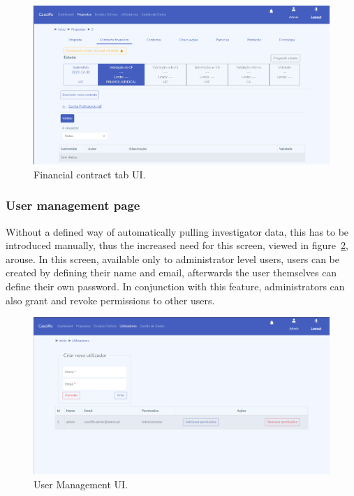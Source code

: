 \begin{figure}[H]
    \centering
    \includegraphics[scale=0.5]{Chapters/img/ui/proposal-cf-tab.png}
    \caption{Financial contract tab UI.}
    \label{fig:cf-tab-ui}
\end{figure}

\subsubsection{User management page}
Without a defined way of automatically pulling investigator data, this has to be introduced manually, thus the increased need for this screen, viewed in figure~\ref{fig:user-management-ui}, arouse. In this screen, available only to administrator level users, users can be created by defining their name and email, afterwards the user themselves can define their own password. In conjunction with this feature, administrators can also grant and revoke permissions to other users.


\begin{figure}[H]
    \centering
    \includegraphics[scale=0.5]{Chapters/img/ui/user-management.png}
    \caption{User Management UI.}
    \label{fig:user-management-ui}
\end{figure}

